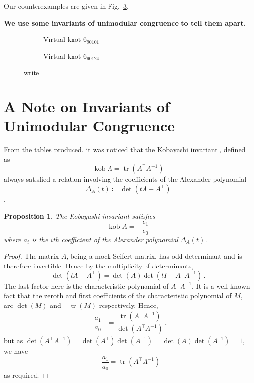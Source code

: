 \documentclass[12pt]{report}
\newcommand{\kob}{\operatorname{kob}}
\newcommand{\notered}[1]{{\color{Red} \textbf{#1}}}
\newtheorem*{proposition}{Proposition}
\begin{document}
Our counterexamples are given in Fig.~\ref{fig:counterexamples}.

\notered{We use some invariants of unimodular congruence to tell them apart.}

\begin{figure}[H]
	\centering
	\hspace*{\fill}
	\begin{subfigure}[b]{0.4 \textwidth}
		\centering
		\def\svgscale{0.35}
		
		\caption{Virtual knot $6_{90101}$}
		\label{fig:6-90101_vknot}
	\end{subfigure}
	\hspace*{\fill}	\hspace*{\fill}	\hspace*{\fill}
	\begin{subfigure}[b]{0.4 \textwidth}
		\centering
		\def\svgscale{0.35}
		
		\caption{Virtual knot $6_{90124}$}
		\label{fig:6-90124_vknot}
	\end{subfigure}
	\hspace*{\fill} 
	\caption{write}
	\label{fig:counterexamples}
\end{figure}

\section{A Note on Invariants of Unimodular Congruence}

From the tables produced, it was noticed that the Kobayashi invariant \cite{new-invariant-under-congruence}, defined as
\[\kob A = \operatorname{tr}(A^{\top}A^{-1})\]
always satisfied a relation involving the coefficients of the Alexander polynomial
\[\Delta_{A}(t) \coloneq \det(tA - A^{\top})\] \cite{mock-seifert-matrices}.


\begin{proposition}
The Kobayashi invariant satisfies
\[\kob A = -\dfrac{a_{1}}{a_{0}}\]
where $a_{i}$ is the $i$th coefficient of the Alexander polynomial $\Delta_{A}(t)$.
\end{proposition}
\begin{proof}
The matrix $A$, being a mock Seifert matrix, has odd determinant \cite{mock-seifert-matrices} and is therefore invertible. Hence by the multiplicity of determinants,
\[\det(tA - A^{\top}) = \det(A)\det(tI - A^{\top}A^{-1})\,.\]
The last factor here is the characteristic polynomial of $A^{\top}A^{-1}$. It is a well known fact that the zeroth and first coefficients of the characteristic polynomial of $M$, are $\det(M)$ and $-\operatorname{tr}(M)$ respectively. Hence,
\begin{align*}
-\dfrac{a_{1}}{a_{0}}	& = \dfrac{\operatorname{tr}(A^{\top}A^{-1})}{\det(A^{\top}A^{-1})}\,,
\end{align*}
but as $\det(A^{\top}A^{-1}) = \det(A^{\top})\det(A^{-1}) = \det(A)\det(A^{-1}) = 1$, we have
\[-\dfrac{a_{1}}{a_{0}} = \operatorname{tr}(A^{\top}A^{-1})\]
as required.
\end{proof}
\end{document}
